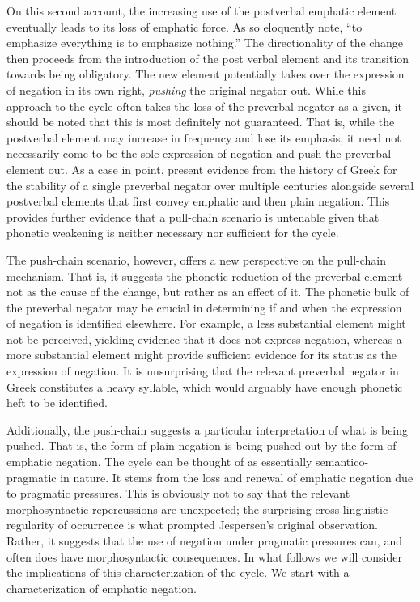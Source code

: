 \documentclass[12pt]{article}
\theoremstyle{definition} \newtheorem{definition}{Definition}
\begin{document}
On this second account, the increasing use of the postverbal emphatic element eventually leads to its loss of emphatic force. As \cite{kiparsky-condoravdi:2006} so eloquently note, ``to emphasize everything is to emphasize nothing.'' The directionality of the change then proceeds from the introduction of the post verbal element and its transition towards being obligatory. The new element potentially takes over the expression of negation in its own right, \emph{pushing} the original negator out. While this approach to the cycle often takes the loss of the preverbal negator as a given, it should be noted that this is most definitely not guaranteed. That is, while the postverbal element may increase in frequency and lose its emphasis, it need not necessarily come to be the sole expression of negation and push the preverbal element out. As a case in point, \cite{kiparsky-condoravdi:2006} present evidence from the history of Greek for the stability of a single preverbal negator over multiple centuries alongside 
several postverbal elements that first convey emphatic and then plain negation. This provides further evidence that a pull-chain scenario is untenable given that phonetic weakening is neither necessary nor sufficient for the cycle.

The push-chain scenario, however, offers a new perspective on the pull-chain mechanism. That is, it suggests the phonetic reduction of the preverbal element not as the cause of the change, but rather as an effect of it. The phonetic bulk of the preverbal negator may be crucial in determining if and when the expression of negation is identified elsewhere. For example, a less substantial element might not be perceived, yielding evidence that it does not express negation, whereas a more substantial element might provide  sufficient evidence for its status as the expression of negation. It is unsurprising that the relevant preverbal negator in Greek constitutes a heavy syllable, which would arguably have enough phonetic heft to be identified.

Additionally, the push-chain suggests a particular interpretation of what is being pushed. That is, the form of plain negation is being pushed out by the form of emphatic negation. The cycle can be thought of as  essentially semantico-pragmatic in nature. It stems from the loss and renewal of emphatic negation due to pragmatic pressures.  This is obviously not to say that the relevant morphosyntactic repercussions are unexpected; the surprising cross-linguistic regularity of occurrence is what prompted Jespersen's original observation. Rather, it suggests that the use of negation under pragmatic pressures can, and often does have morphosyntactic consequences. In what follows we will consider the implications of this characterization of the cycle. We start with a characterization of emphatic negation.
\end{document}

